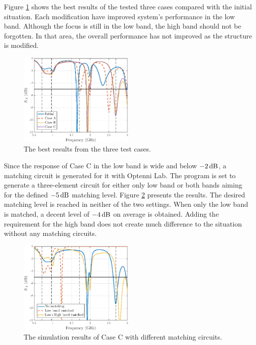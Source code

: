 Figure \ref{fig:concept2} shows the best results of the tested three cases compared with the initial situation. Each modification have improved system's performance in the low band. Although the focus is still in the low band, the high band should not be forgotten. In that area, the overall performance has not improved as the structure is modified. 
\begin{figure}[H]
    \vspace{-5pt}
    \centering
    \includegraphics[width=0.5\textwidth]{img/concept2.eps}
    \caption{The best results from the three test cases.}
    \label{fig:concept2}
\end{figure}

Since the response of Case C in the low band is wide and below $-2\,\mathrm{dB}$, a matching circuit is generated for it with Optenni Lab. The program is set to generate a three-element circuit for either only low band or both bands aiming for the defined $-5\,\mathrm{dB}$ matching level. Figure \ref{fig:concept2_match} presents the results. The desired matching level is reached in neither of the two settings. When only the low band is matched, a decent level of $-4\,\mathrm{dB}$ on average is obtained. Adding the requirement for the high band does not create much difference to the situation without any matching circuits. 
\begin{figure}[H]
    \centering
    \includegraphics[width=0.5\textwidth]{img/concept2_match.eps}
    \caption{The simulation results of Case C with different matching circuits.}
    \label{fig:concept2_match}
    \vspace{-10pt}
\end{figure}

